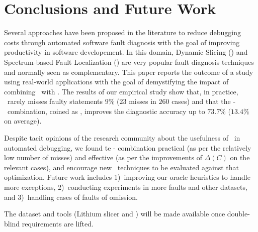 \documentclass{article}
\begin{document}
\section{Conclusions and Future Work}
\label{sec:conc}
%

Several approaches have been proposed in the literature to reduce debugging
costs through automated software fault diagnosis with the goal of
improving productivity in software developement. In this domain, Dynamic Slicing (\ds)
and Spectrum-based Fault Localization (\sfl) are very popular fault diagnosis
techniques and normally seen as complementary. This paper reports the outcome of
a study using real-world applications with the goal of demystifying the impact
of combining \ds~with \sfl. The results of our empirical study show that, in
practice, \ds~rarely misses faulty statements $9\%$ ($23$ misses in $260$ cases) and that
the \ds-\sfl~combination, coined as ,
improves the diagnostic accuracy up to $73.7\%$ ($13.4\%$ on average).

Despite tacit opinions of the research community about the usefulness
of \ds~in automated debugging, we found te \ds{}-\sfl{} combination
practical (as per the relatively low number of misses) and effective
(as per the improvements of $\Delta(C)$ on the relevant cases), and
encourage new \sfl~techniques to be evaluated against that
optimization.  Future work includes 1)~improving our oracle heuristics
to handle more exceptions, 2)~conducting experiments in more \dfj{}
faults and other datasets, and 3)~handling cases of faults of
omission.

The dataset and tools (Lithium slicer and \comb{}) will be made
available once double-blind requirements are lifted.


%
{
  \small
  \balance
  
  
}
\end{document}
